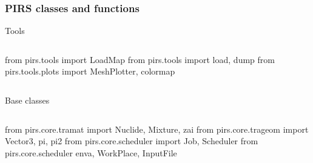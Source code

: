 \begin{frame}[fragile]
    \frametitle{PIRS classes and functions}

    \begin{block}{Tools}
    \begin{columns}
        \begin{pythoncode}
        from pirs.tools import LoadMap
        from pirs.tools import load, dump
        from pirs.tools.plots import MeshPlotter, colormap
        \end{pythoncode}
    \end{columns}
    \end{block}

    \begin{block}{Base classes}
    \begin{columns}
        \begin{pythoncode}
        from pirs.core.tramat import Nuclide, Mixture, zai
        from pirs.core.trageom import Vector3, pi, pi2
        from pirs.core.scheduler import Job, Scheduler
        from pirs.core.scheduler enva, WorkPlace, InputFile
        \end{pythoncode}
    \end{columns}
    \end{block}

\end{frame}

